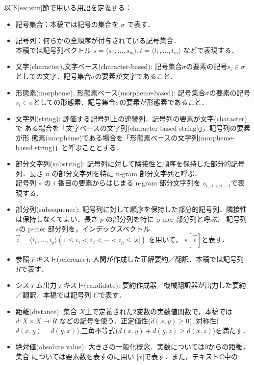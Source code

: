 \documentclass[japanese]{jnlp_1.4}
\newcommand{\modified}[1]{}
\begin{document}
以下\ref{sec:sim}節で用いる用語を定義する：
\begin{itemize}
\item 記号集合：本稿では記号の集合を $\sigma$ で表す．
\item 記号列：何らかの全順序が付与されている記号集合．\\
  本稿では記号列ベクトル $s = \langle s_{1}, \ldots, s_{m} \rangle, t = \langle t_{1}, \ldots, t_{m} \rangle$ などで表現する．
\item 文字(character),文字ベース(character-based): 記号集合$\sigma$の要素の記号$s_{i}\in\sigma$としての文字．記号集合$\sigma$の要素が文字であること．
\item 形態素(morpheme), 形態素ベース(morpheme-based): 記号集合$\sigma$の要素の記号$s_{i}\in\sigma$としての形態素．記号集合$\sigma$の要素が形態素であること．
\item 文字列(string): 評価する記号列上の連続列．記号列の要素が文字(character)で
      ある場合を「文字ベースの文字列(character-based string)」，記号列の要素が形
      態素(morpheme)である場合を「形態素ベースの文字列(morpheme-based string)」と呼ぶこととする．
\item 部分文字列(substring): 記号列に対して隣接性と順序を保持した部分的記号列．長さ $n$ の部分文字列を特に n-gram 部分文字列と呼ぶ．\\
  記号列 $s$ の $i$ 番目の要素からはじまる n-gram 部分文字列を
      $s_{i \ldots i+n-1}$で表現する．
\item 部分列(subsequence): 記号列に対して順序を保持した部分的記号列．隣接性は保持しなくてよい．長さ $p$ の部分列を特に p-mer 部分列と呼ぶ．
  記号列 $s$の p-mer 部分列を，インデックスベクトル $\vec{i}=\langle i_{1},\ldots,i_{p}\rangle (1\leq i_{1} < i_{2} < \cdots < i_{p} \leq |s|)$ を用いて，
  $s[\vec{i}]$と表す．
 \item 参照テキスト(reference): 人間が作成した正解要約／翻訳．本稿では記号列 $R$で表す．
\item システム出力テキスト(candidate): 要約作成器／機械翻訳器が出力した要約／翻訳．本稿では記号列 $C$で表す．
\item 距離(distance): 集合 $X$上で定義された2変数の実数値関数で，本稿では $d: X \times X \rightarrow R$ などの記号を使う．正定値性($d(x,y) \geq 0$),\modified{非退化性($x=y \Rightarrow d(x, y) = 0$)},対称性($d(x,y)=d(y,x)$),三角不等式($d(x,y)+d(y,z)\geq d(x,z)$)を満たす．
\item 絶対値(absolute value): 大きさの一般化概念．実数については0からの距離，集合
      については要素数を表すのに用い $|x|$で表す．また，テキストC中の

\end{itemize}
\end{document}
